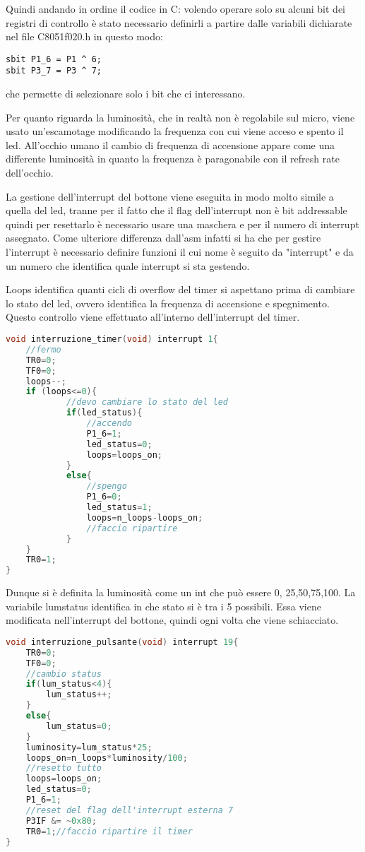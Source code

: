\documentclass[main.tex]{subfiles}
\begin{document}
Quindi andando in ordine il codice in C: volendo operare solo su alcuni bit dei registri di controllo è stato necessario definirli a partire dalle variabili dichiarate nel file C8051f020.h in questo modo:
\begin{lstlisting}
sbit P1_6 = P1 ^ 6;
sbit P3_7 = P3 ^ 7;
\end{lstlisting}
che permette di selezionare solo i bit che ci interessano. 

Per quanto riguarda la luminosità, che in realtà non è regolabile sul micro, viene usato un'escamotage modificando la frequenza con cui viene acceso e spento il led. All'occhio umano il cambio di frequenza di accensione appare come una differente luminosità in quanto la frequenza è paragonabile con il refresh rate dell'occhio. 

La gestione dell'interrupt del bottone viene eseguita in modo molto simile a quella del led, tranne per il fatto che il flag dell'interrupt non è bit addressable quindi per resettarlo è necessario usare una maschera e per il numero di interrupt assegnato. 
Come ulteriore differenza dall'asm infatti si ha che per gestire l'interrupt è necessario definire funzioni il cui nome è seguito da "interrupt" e da un numero che identifica quale interrupt si sta gestendo. 

 Loops identifica quanti cicli di overflow del timer si aspettano prima di cambiare lo stato del led, ovvero identifica la frequenza di accensione e spegnimento. Questo controllo viene effettuato all'interno dell'interrupt del timer.
 \begin{lstlisting}[language=C,caption=Interrupt timer]
 void interruzione_timer(void) interrupt 1{
	//fermo
	TR0=0;
	TF0=0;
	loops--;
	if (loops<=0){
	        //devo cambiare lo stato del led
			if(led_status){
				//accendo
				P1_6=1;
				led_status=0;
				loops=loops_on;
			}
			else{
				//spengo
				P1_6=0;
				led_status=1;
				loops=n_loops-loops_on;
				//faccio ripartire
			}
	}
	TR0=1;
}
 \end{lstlisting}
 
 Dunque si è definita la luminosità come un int che può essere 0, 25,50,75,100. La variabile lumstatus identifica in che stato si è tra i 5 possibili. Essa viene modificata nell'interrupt del bottone, quindi ogni volta che viene schiacciato.
 \begin{lstlisting}[language=C, caption=Interrupt pulsante]
 void interruzione_pulsante(void) interrupt 19{
	TR0=0;
	TF0=0;
	//cambio status
	if(lum_status<4){
		lum_status++;
	}
	else{
		lum_status=0;
	}
	luminosity=lum_status*25;
	loops_on=n_loops*luminosity/100;
	//resetto tutto
	loops=loops_on;
	led_status=0;
	P1_6=1;
	//reset del flag dell'interrupt esterna 7
	P3IF &= ~0x80;
	TR0=1;//faccio ripartire il timer
}
 \end{lstlisting}
\end{document}
